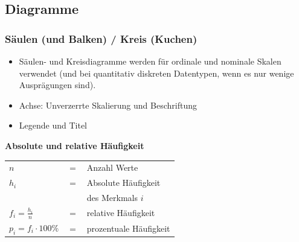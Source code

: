 \begin{multicols}{2}
%
\keinHeaderUndKeinFooter{}

\RLP{\forceCB}%
\keinHeaderUndKeinFooter{}

\subsection*{Diagramme}
\keinHeaderUndKeinFooter{}

\subsubsection*{Säulen (und Balken) / Kreis (Kuchen)}
\keinHeaderUndKeinFooter{}


\begin{itemize}
\item Säulen- und Kreisdiagramme werden für ordinale und nominale
  Skalen verwendet (und bei quantitativ diskreten Datentypen, wenn es
  nur wenige Ausprägungen sind).
\item Achse: Unverzerrte Skalierung und Beschriftung
\item Legende und Titel
\end{itemize}

\keinHeaderUndKeinFooter{}

\begin{tcolorbox}[colback=white]
  \textbf{Absolute und relative Häufigkeit}\\
\begin{tabular}{lcl}

$n$   &$=$& Anzahl Werte\\
$h_i$ &$=$& Absolute Häufigkeit\\
      & & des Merkmals $i$\\
$f_i = \frac{h_i}n$ &$=$& relative Häufigkeit\\
$p_i = f_i\cdot{}100\%$ &$=$& prozentuale Häufigkeit%
  \end{tabular}
\end{tcolorbox}

\keinHeaderUndKeinFooter{}

\RLP{\forceCB}


\end{multicols}
